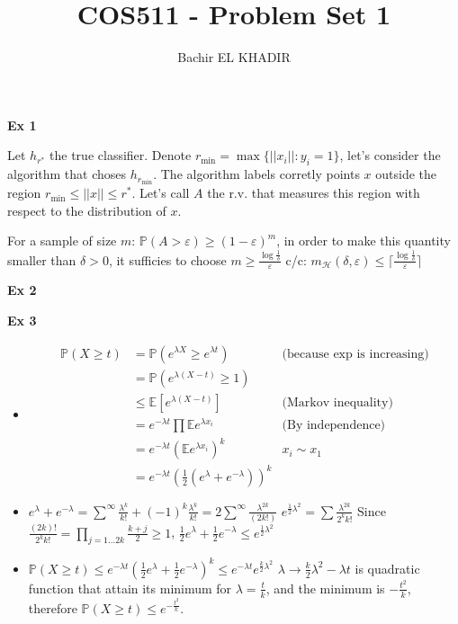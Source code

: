 \documentclass[12pt]{article}
\title{COS511 - Problem Set 1}
\author{Bachir EL KHADIR }
\newcommand{\Q}[1]{\textbf{Ex #1}}
\newcommand{\esp}{{\mathbb E}}
\begin{document}
\maketitle

\Q{1}

Let $h_{r^*}$ the true classifier.
Denote $r_{\min} = \max \{ ||x_i|| : y_i = 1 \}$, let's consider the algorithm that choses $h_{r_{\min}}$.
The algorithm labels corretly points $x$ outside the region $r_{\min} \le ||x|| \le r^*$.
Let's call $A$ the r.v. that measures this region with respect to the distribution of $x$.

For a sample of size $m$: $\mathbb P(A > \varepsilon) \ge (1 - \varepsilon)^m$, in order to make this quantity smaller than $\delta > 0$, it sufficies to choose $m \ge \frac{\log \frac1\delta}{\varepsilon}
$
c/c: $m_{\mathcal H}(\delta, \varepsilon) \le \lceil \frac{\log \frac1\delta}{\varepsilon} \rceil$

\Q{2}

\Q{3}
\begin{itemize}
\item
  \begin{align*}
    \mathbb P( X \ge t) &= \mathbb P( e^{\lambda X} \ge e^{\lambda t}) &\text{(because $\exp$ is increasing)}
    \\& =  \mathbb P( e^{\lambda (X - t)} \ge 1)
    \\&\le \esp[e^{\lambda (X - t)} ] &\text{(Markov inequality)}
    \\&= e^{-\lambda t} \prod \esp e^{\lambda x_i} &\text{(By independence)}
    \\& = e^{-\lambda t} (\esp e^{\lambda x_i})^k &x_i \sim x_1
    \\& = e^{-\lambda t} (\frac12 (e^{\lambda} + e^{-\lambda}))^k 
  \end{align*}
\item
  $e^{\lambda} + e^{-\lambda} = \sum^{\infty} \frac{\lambda^k}{k!} + (-1)^k \frac{\lambda^k}{k!} = 2 \sum^{\infty}  \frac{\lambda^{2k}}{(2k!)}$
  $e^{\frac12 \lambda^2} = \sum \frac{\lambda^{2k}}{2^k k!}$
  Since $\frac{(2k)!}{2^kk!} = \prod_{j = 1 \ldots 2k} \frac{k+j}{2} \ge 1$, $\frac12 e^{\lambda} + \frac12 e^{-\lambda} \le e^{\frac12 \lambda^2}$

\item $\mathbb P(X \ge t) \le e^{-\lambda t} (\frac12 e^{\lambda} + \frac12 e^{-\lambda})^k \le e^{-\lambda t} e^{\frac k2 \lambda^2}$
$\lambda \rightarrow \frac k2 \lambda^2 - \lambda t$ is quadratic function that attain its minimum for $\lambda = \frac tk$, and the minimum is $-\frac{t^2}k$, therefore $ \mathbb P(X \ge t) \le e^{-\frac{t^2}k}$.
\end{itemize}
\end{document}
